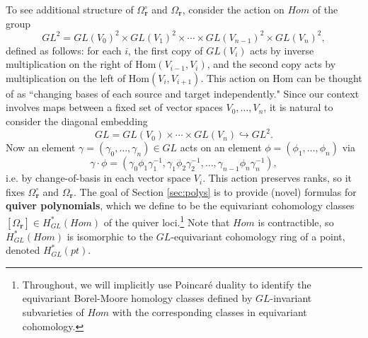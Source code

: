 \documentclass[reqno]{amsart}
\def\Hom{\textrm{Hom}}
\numberwithin{equation}{section}
\theoremstyle{definition}
\theoremstyle{remark}
\begin{document}
To see additional structure of $\Omega_{\mathbf{r}}^\circ$ and $\Omega_{\mathbf{r}}$, consider the action on $Hom$ of the group
\[GL^2=GL(V_0)^2 \times GL(V_1)^2 \times \cdots \times GL(V_{n-1})^2 \times GL(V_n)^2,\]
defined as follows: for each $i$, the first copy of $GL(V_i)$ acts by inverse multiplication on the right of $\Hom(V_{i-1},V_i)$, and the second copy acts by multiplication on the left of $\Hom(V_{i},V_{i+1})$. This action on $\Hom$ can be thought of as ``changing bases of each source and target independently." Since our context involves maps between a fixed set of vector spaces $V_0,\dots,V_n$, it is natural to consider the diagonal embedding
\[GL=GL(V_0)\times \cdots \times GL(V_n) \hookrightarrow GL^2.\]
Now an element $\gamma=(\gamma_0,\dots,\gamma_n) \in GL$ acts on an element $\phi=(\phi_1,\dots,\phi_n)$ via
\[\gamma \cdot \phi=(\gamma_0\phi_1\gamma_1^{-1},\gamma_1\phi_2\gamma_2^{-1},\dots,\gamma_{n-1}\phi_n\gamma_n^{-1}),\]
i.e. by change-of-basis in each vector space $V_i$. This action preserves ranks, so it fixes $\Omega_{\mathbf{r}}^\circ$ and $\Omega_{\mathbf{r}}$.
The goal of Section \ref{sec:polys} is to provide (novel) formulas for \textbf{quiver polynomials}, which we define to be the equivariant cohomology classes $[\Omega_{\mathbf{r}}] \in H^*_{GL}(Hom)$ of the quiver loci.\footnote{Throughout, we will implicitly use Poincar{\'e} duality to identify the equivariant Borel-Moore homology classes defined by $GL$-invariant subvarieties of $Hom$ with the corresponding classes in equivariant cohomology.} Note that $Hom$ is contractible, so $H^*_{GL}(Hom)$ is isomorphic to the $GL$-equivariant cohomology ring of a point, denoted $H^*_{GL}(pt)$.
\end{document}

